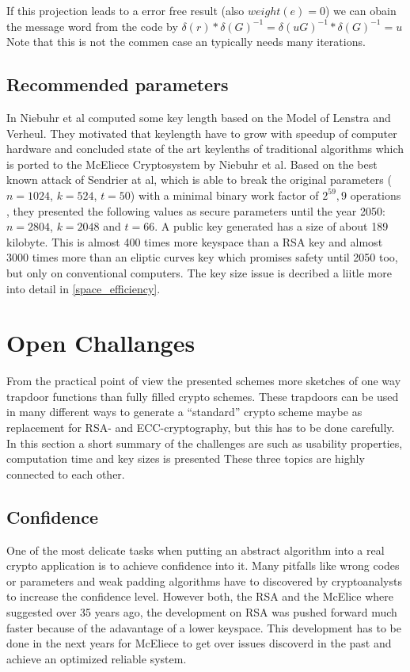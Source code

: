  If this projection leads to a error free result (also $weight(e) = 0$) we can obain the message word from the code by $\delta(r)* \delta(G)^{-1} = \delta(uG)^{-1}*\delta(G)^{-1} = u$
 Note that this is not the commen case an typically needs many iterations.
 


\subsection{Recommended parameters}
In \cite{niebuhr2012selecting} Niebuhr et al computed some key length based on the Model of Lenstra and Verheul. They motivated that keylength have to grow with speedup of computer hardware and concluded state of the art keylenths of traditional algorithms which is ported to the McEliece Cryptosystem by Niebuhr et al. Based on the best known attack of Sendrier at al, which is able to break the original parameters ($n = 1024$, $k = 524$, $t = 50$) with a minimal binary work factor of $2^59,9$ operations \cite{finiasz2009security}, they presented the following values as secure parameters until the year 2050: $n = 2804$, $k = 2048$ and $t = 66$. A public key generated has a size of about 189 kilobyte. This is almost 400 times more keyspace than a RSA key and almost 3000 times more than an eliptic curves key which promises safety until 2050 too, but only on conventional computers. The key size issue is decribed a liitle more into detail in \ref{space_efficiency}.


\section{Open Challanges}
From the practical point of view the presented schemes more sketches of one way trapdoor functions than fully filled crypto schemes. These trapdoors can be used in many different ways to generate a ``standard'' crypto scheme maybe as replacement for RSA- and ECC-cryptography, but this has to be done carefully. In this section a short summary of the challenges are such as usability properties, computation time and key sizes is presented  These three topics are highly connected to each other. 

\subsection*{Confidence}
\label{confidence}
One of the most delicate tasks when putting an abstract algorithm into a real crypto application is to achieve confidence into it. Many pitfalls like wrong codes or parameters and weak padding algorithms have to discovered by cryptoanalysts to increase the confidence level. However both, the RSA and the McElice where suggested over 35 years ago, the development on RSA was pushed forward much faster because of the adavantage of a lower keyspace. This development has to be done in the next years for McEliece to get over issues discoverd in the past and achieve an optimized reliable system. 

